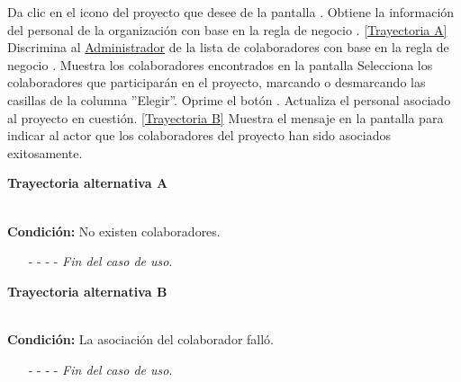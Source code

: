 	\begin{UCtrayectoria}
		\UCpaso[\UCactor] Da clic en el icono  del proyecto que desee de la pantalla .
		\UCpaso[\UCsist] Obtiene la información del personal de la organización con base en la regla de negocio . \hyperlink{CU4-1:TAA}{[Trayectoria A]}
		\UCpaso[\UCsist] Discrimina al \hyperlink{admin}{Administrador} de la lista de colaboradores con base en la regla de negocio .
		\UCpaso[\UCsist] Muestra los colaboradores encontrados en la pantalla 
		\UCpaso[\UCactor] Selecciona los colaboradores que participarán en el proyecto, marcando o desmarcando las casillas de la columna ''Elegir''.
		\UCpaso[\UCactor] Oprime el botón .
		\UCpaso[\UCsist] Actualiza el personal asociado al proyecto en cuestión. \hyperlink{CU4-1:TAB}{[Trayectoria B]}
		\UCpaso[\UCsist] Muestra el mensaje  en la pantalla  para indicar al actor que los colaboradores del proyecto han sido asociados exitosamente.
	\end{UCtrayectoria}		
	\hypertarget{CU4-1:TAA}{\textbf{Trayectoria alternativa A}}\\
	\noindent \textbf{Condición:} No existen colaboradores.
	\begin{enumerate}
		\UCpaso[\UCsist] Muestra el mensaje  en la pantalla  para indicar que no hay registros para mostrar.
		\item[- -] - - {\em {Fin del caso de uso}}.%
	\end{enumerate}

\hypertarget{CU4-1:TAB}{\textbf{Trayectoria alternativa B}}\\
\noindent \textbf{Condición:} La asociación del colaborador falló.
\begin{enumerate}
	\UCpaso[\UCsist] Muestra el mensaje  en la pantalla  para indicar que ocurrió un error al asociar a los colaboradores.
	\item[- -] - - {\em {Fin del caso de uso}}.%
\end{enumerate}
	
